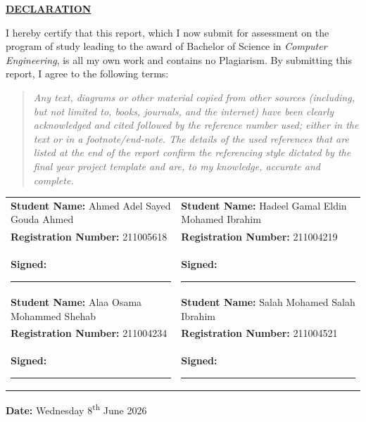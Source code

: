 \newpage
\thispagestyle{empty} 

\begin{center}
    \Large \textbf{\uline{DECLARATION}}
\end{center}
\vspace{0.8cm}

\normalsize
\noindent I hereby certify that this report, which I now submit for assessment on the program of study leading to the award of Bachelor of Science in \textit{Computer Engineering}, is all my own work and contains no Plagiarism. By submitting this report, I agree to the following terms:\vspace{0.2cm}

\begin{quote}
    \textit{Any text, diagrams or other material copied from other sources (including, but not limited to, books, journals, and the internet) have been clearly acknowledged and cited followed by the reference number used; either in the text or in a footnote/end-note. The details of the used references that are listed at the end of the report confirm the referencing style dictated by the final year project template and are, to my knowledge, accurate and complete.}
\end{quote}
\vspace{0.2cm}

\par\vspace{1.2cm}

\noindent
\begin{tabular}{@{} >{\raggedright\arraybackslash}p{} >{\raggedright\arraybackslash}p{} @{}}
    \textbf{Student Name:} Ahmed Adel Sayed Gouda Ahmed & \textbf{Student Name:} Hadeel Gamal Eldin Mohamed Ibrahim \\[0.3cm]
    \textbf{Registration Number:} 211005618 & \textbf{Registration Number:} 211004219  \\[0.3cm]
    \textbf{Signed:} \rule{4.5cm}{0.4pt} & \textbf{Signed:} \rule{4.5cm}{0.4pt} \\[1cm]
    
    \textbf{Student Name:} Alaa Osama Mohammed Shehab & \textbf{Student Name:} Salah Mohamed Salah Ibrahim \\[0.3cm]
    \textbf{Registration Number:} 211004234 & \textbf{Registration Number:} 211004521 \\[0.3cm]
    \textbf{Signed:} \rule{4.5cm}{0.4pt} & \textbf{Signed:} \rule{4.5cm}{0.4pt} \\
\end{tabular}

\vfill 

\noindent \textbf{Date:} Wednesday 8\textsuperscript{th} June 2026